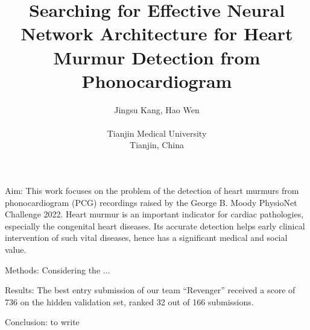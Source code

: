 \documentclass{cinc-abstract}
\begin{document}
\title{Searching for Effective Neural Network Architecture for Heart Murmur Detection from Phonocardiogram}

\author {Jingsu Kang, Hao Wen\\ %
\ \\ %
Tianjin Medical University\\  %
Tianjin, China} %

\maketitle



Aim: This work focuses on the problem of the detection of heart murmurs from phonocardiogram (PCG) recordings raised by the George B. Moody PhysioNet Challenge 2022. Heart murmur is an important indicator for cardiac pathologies, especially the congenital heart diseases. Its accurate detection helps early clinical intervention of such vital diseases, hence has a significant medical and social value.

Methods: Considering the ...

Results: The best entry submission of our team ``Revenger'' received a score of 736 on the hidden validation set, ranked 32 out of 166 submissions.

Conclusion: to write
\end{document}
